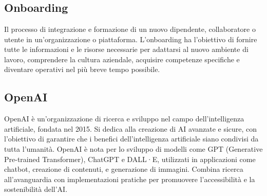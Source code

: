 \newpage



\section{}

\hypertarget{sec:onboarding}{}
\subsection*{Onboarding}
Il processo di integrazione e formazione di un nuovo dipendente, collaboratore o utente in un'organizzazione o piattaforma. L'onboarding ha l'obiettivo di 
fornire tutte le informazioni e le risorse necessarie per adattarsi al nuovo ambiente di lavoro, comprendere la cultura aziendale, acquisire competenze 
specifiche e diventare operativi nel più breve tempo possibile. 

\hypertarget{sec:openai}{}
\subsection*{OpenAI}
OpenAI è un'organizzazione di ricerca e sviluppo nel campo dell'intelligenza artificiale, fondata nel 2015. Si dedica alla creazione di AI avanzate e 
sicure, con l'obiettivo di garantire che i benefici dell'intelligenza artificiale siano condivisi da tutta l'umanità. OpenAI è nota per lo sviluppo di 
modelli come GPT (Generative Pre-trained Transformer), ChatGPT e DALL·E, utilizzati in applicazioni come chatbot, creazione di contenuti, e generazione 
di immagini. Combina ricerca all'avanguardia con implementazioni pratiche per promuovere l'accessibilità e la sostenibilità dell'AI.


\newpage